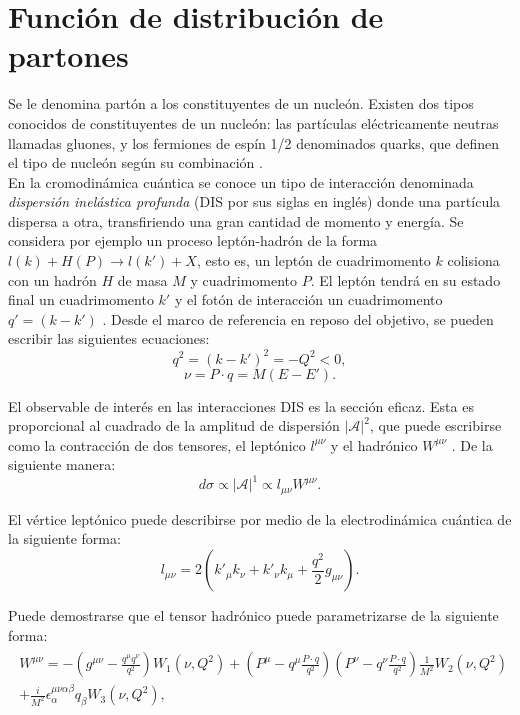 \documentclass[titlepage,11pt]{report}
\begin{document}
\section{Función de distribución de partones}

Se le denomina partón a los constituyentes de un nucleón. Existen dos tipos conocidos de constituyentes de un nucleón: las partículas eléctricamente neutras llamadas gluones, y los fermiones de espín 1/2 denominados quarks, que definen el tipo de nucleón según su combinación \cite{Lopez2025}. \\



En la cromodinámica cuántica se conoce un tipo de interacción denominada \textit{dispersión inelástica profunda} (DIS por sus siglas en inglés) donde una partícula dispersa a otra, transfiriendo una gran cantidad de momento y energía. Se considera por ejemplo un proceso leptón-hadrón de la forma $l(k)+H(P)\to l(k')+X$, esto es, un leptón de cuadrimomento $k$ colisiona con un hadrón $H$ de masa $M$ y cuadrimomento $P$. El leptón tendrá en su estado final un cuadrimomento $k'$ y el fotón de interacción un cuadrimomento $q'=(k-k')$ \cite{doi:https://doi.org/10.1002/352760314X.ch2}. Desde el marco de referencia en reposo del objetivo, se pueden escribir las siguientes ecuaciones:
\begin{equation*}
    q^2=(k-k')^2=-Q^2<0,
\end{equation*}
\begin{equation*}
    \nu = P\cdot q=M(E-E').
\end{equation*}

El observable de interés en las interacciones DIS es la sección eficaz. Esta es proporcional al cuadrado de la amplitud de dispersión $|\mathcal{A}|^2$, que puede escribirse como la contracción de dos tensores, el leptónico $l^{\mu \nu}$ y el hadrónico $W^{\mu \nu}$ \cite{Lopez2025}. De la siguiente manera:
\begin{equation*}
    d\sigma \propto |\mathcal{A}|^1\propto l_{\mu\nu}W^{\mu\nu}.
\end{equation*}

El vértice leptónico puede describirse por medio de la electrodinámica cuántica de la siguiente forma:
\begin{equation*}
    l_{\mu\nu}=2\left(k'_\mu k_\nu+k'_\nu k_\mu+\frac{q^2}{2}g_{\mu\nu}\right).
\end{equation*}

Puede demostrarse que el tensor hadrónico puede parametrizarse de la siguiente forma:
\begin{align}\label{longW}\begin{split}
    W^{\mu\nu}=-\left(g^{\mu\nu}-\frac{q^{\mu}q^{\nu}}{q^2}\right)W_1(\nu, Q^2)+\left(P^{\mu}-q^{\mu}\frac{P\cdot q}{q^2}\right)\left(P^{\nu}-q^{\nu}\frac{P\cdot q}{q^2}\right)\frac{1}{M^2}W_2(\nu, Q^2)\\+\frac{i}{M^2}\epsilon_{\alpha}^{\mu\nu\alpha\beta}q_{\beta}W_3(\nu, Q^2), 
\end{split}
\end{align}
\end{document}
